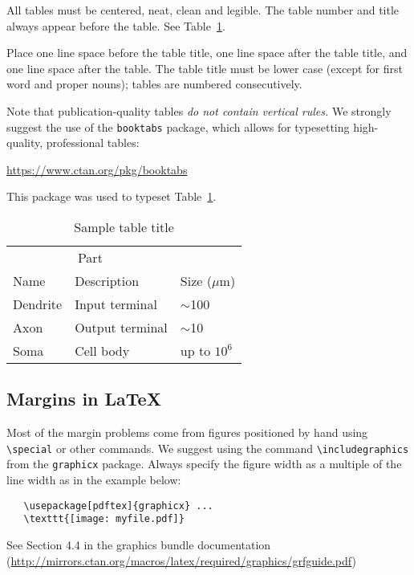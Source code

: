 \documentclass{article}
\begin{document}
All tables must be centered, neat, clean and legible.  The table number and
title always appear before the table.  See Table~\ref{sample-table}.


Place one line space before the table title, one line space after the
table title, and one line space after the table. The table title must
be lower case (except for first word and proper nouns); tables are
numbered consecutively.


Note that publication-quality tables \emph{do not contain vertical rules.} We
strongly suggest the use of the \verb+booktabs+ package, which allows for
typesetting high-quality, professional tables:
\begin{center}
  \url{https://www.ctan.org/pkg/booktabs}
\end{center}
This package was used to typeset Table~\ref{sample-table}.


\begin{table}
  \caption{Sample table title}
  \label{sample-table}
  \centering
  \begin{tabular}{lll}
    \toprule
    \multicolumn{2}{c}{Part}                   \\
    \cmidrule(r){1-2}
    Name     & Description     & Size ($\mu$m) \\
    \midrule
    Dendrite & Input terminal  & $\sim$100     \\
    Axon     & Output terminal & $\sim$10      \\
    Soma     & Cell body       & up to $10^6$  \\
    \bottomrule
  \end{tabular}
\end{table}



\subsection{Margins in \LaTeX{}}


Most of the margin problems come from figures positioned by hand using
\verb+\special+ or other commands. We suggest using the command
\verb+\includegraphics+ from the \verb+graphicx+ package. Always specify the
figure width as a multiple of the line width as in the example below:
\begin{verbatim}
   \usepackage[pdftex]{graphicx} ...
   \texttt{[image: myfile.pdf]}
\end{verbatim}
See Section 4.4 in the graphics bundle documentation
(\url{http://mirrors.ctan.org/macros/latex/required/graphics/grfguide.pdf})
\end{document}
